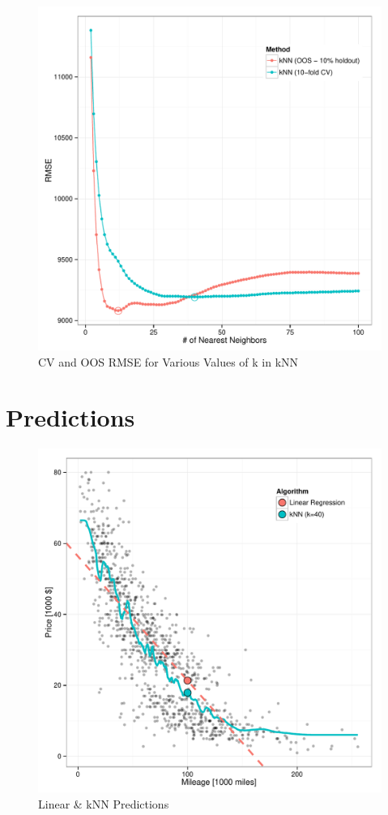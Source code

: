 \documentclass[11pt, fleqn, titlepage]{article}
\begin{document}
\begin{figure}[!htb]
  \centering
  \includegraphics[scale=.5]{sweep_kknn.pdf}
  \caption{CV and OOS RMSE for Various Values of k in kNN}
  \label{fig:sweep}
\end{figure}

\section{Predictions}

\begin{figure}[!htb]
  \centering
  \includegraphics[scale=.5]{predict.pdf}
  \caption{Linear & kNN Predictions}
  \label{fig:predict}
\end{figure}
\end{document}
